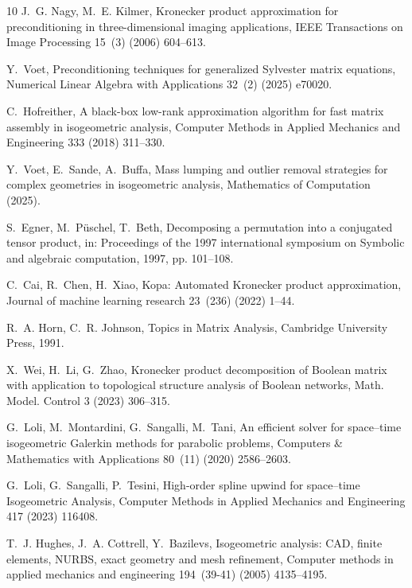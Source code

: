\documentclass{article}
\numberwithin{equation}{section}
\theoremstyle{definition}
\begin{document}
\begin{thebibliography}{10}
J.~G. Nagy, M.~E. Kilmer, {Kronecker product approximation for preconditioning in three-dimensional imaging applications}, IEEE Transactions on Image Processing 15~(3) (2006) 604--613.

Y.~Voet, {Preconditioning techniques for generalized Sylvester matrix equations}, Numerical Linear Algebra with Applications 32~(2) (2025) e70020.

C.~Hofreither, {A black-box low-rank approximation algorithm for fast matrix assembly in isogeometric analysis}, Computer Methods in Applied Mechanics and Engineering 333 (2018) 311--330.

Y.~Voet, E.~Sande, A.~Buffa, {Mass lumping and outlier removal strategies for complex geometries in isogeometric analysis}, Mathematics of Computation (2025).

S.~Egner, M.~P{\"u}schel, T.~Beth, {Decomposing a permutation into a conjugated tensor product}, in: Proceedings of the 1997 international symposium on Symbolic and algebraic computation, 1997, pp. 101--108.

C.~Cai, R.~Chen, H.~Xiao, {Kopa: Automated Kronecker product approximation}, Journal of machine learning research 23~(236) (2022) 1--44.

R.~A. Horn, C.~R. Johnson, {Topics in Matrix Analysis}, Cambridge University Press, 1991.

X.~Wei, H.~Li, G.~Zhao, {Kronecker product decomposition of Boolean matrix with application to topological structure analysis of Boolean networks}, Math. Model. Control 3 (2023) 306--315.

G.~Loli, M.~Montardini, G.~Sangalli, M.~Tani, {An efficient solver for space--time isogeometric Galerkin methods for parabolic problems}, Computers \& Mathematics with Applications 80~(11) (2020) 2586--2603.

G.~Loli, G.~Sangalli, P.~Tesini, {High-order spline upwind for space--time Isogeometric Analysis}, Computer Methods in Applied Mechanics and Engineering 417 (2023) 116408.

T.~J. Hughes, J.~A. Cottrell, Y.~Bazilevs, {Isogeometric analysis: CAD, finite elements, NURBS, exact geometry and mesh refinement}, Computer methods in applied mechanics and engineering 194~(39-41) (2005) 4135--4195.


\end{thebibliography}
\end{document}
